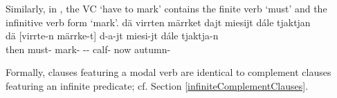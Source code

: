 Similarly, in , the VC  ‘have to mark’ contains the finite verb  ‘must’ and the infinitive verb form  ‘mark’. 
\ea\label{VCex5a}
\glll	dä virrten märrket dajt miesijt dále tjaktjan\\
	dä {[virrte-n} {märrke-t]\subVC} d-a-jt miesi-jt dále tjaktja-n\\
	then must- mark- -- calf- now autumn-\\\nopagebreak
{}	
\z

Formally, clauses featuring a modal verb are identical to complement clauses featuring an infinite predicate; cf. Section \ref{infiniteComplementClauses}. 

